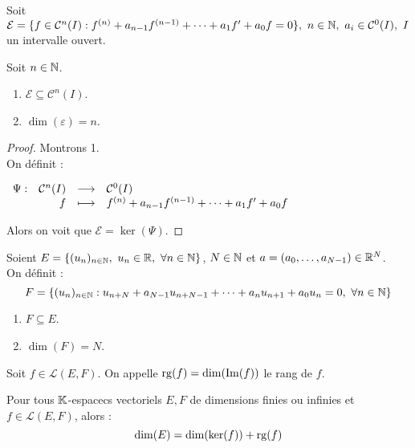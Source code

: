 Soit $\mathcal{E} = \{ f \in \mathcal{C}^n(I) : f^{(n)} + a_{n - 1} f^{(n - 1)} + \cdots + a_1 f' + a_0 f = 0 \},\ n \in \mathbb{N},\ a_i \in \mathcal{C}^0(I),\ I$ un intervalle ouvert.

\begin{proposition}
    Soit $n \in \mathbb{N}$.
    \begin{multicols}{2}
        \begin{enumerate}
            \item $\mathcal{E} \subseteq \mathcal{C}^n(I)$.
            \item $\dim(\varepsilon) = n$.
        \end{enumerate}
    \end{multicols}
\end{proposition}

\begin{proof}
	Montrons 1. \\
	On définit :
	\begin{center}
		$\begin{array}{rrcl} \Psi : & \mathcal{C}^n(I) & \longrightarrow & \mathcal{C}^0(I) \\ & f & \longmapsto & f^{(n)} + a_{n-1}f^{(n-1)} + \cdots + a_1 f' + a_0 f \end{array}$
	\end{center}
	Alors on voit que $\mathcal{E} = \ker(\Psi)$.
\end{proof}

Soient $E = \{ (u_n)_{n \in \mathbb{N}},\ u_n \in \mathbb{R},\ \forall n \in \mathbb{N} \}$, $N \in \mathbb{N}$ et $a = (a_0, \ldots, a_{N-1}) \in \mathbb{R}^N$.
\\
On définit :
\[ F = \{ (u_n)_{n \in \N} : u_{n + N} + a_{N-1} u_{n + N - 1} + \cdots + a_n u_{n+1} + a_0 u_n = 0,\ \forall n \in \N \} \]

\begin{theorem}
	\begin{multicols}{2}
		\begin{enumerate}
			\item $F \subseteq E$.
			\item $\dim(F) = N$.
		\end{enumerate}
	\end{multicols}
\end{theorem}

\begin{definition}
    Soit $f \in \mathcal{L}(E, F)$. On appelle $\operatorname{rg}(f) = \dim(\Im(f))$ le rang de $f$.
\end{definition}

\begin{theorem}
    Pour tous $\mathbb{K}$-espacecs vectoriels $E, F$ de dimensions finies ou infinies et $f \in \mathcal{L}(E, F)$, alors :
    \[ \dim(E) = \dim(\ker(f)) + \operatorname{rg}(f) \]
\end{theorem}

